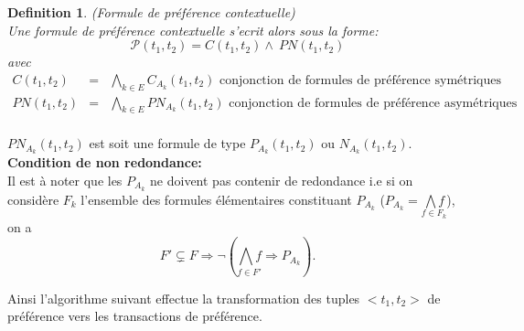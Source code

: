\documentclass[a4paper,12pt,openany,oneside]{article}
\newtheorem{defn}{Definition} %
\begin{document}
	
 	\begin{defn}(Formule de préférence contextuelle)\\
 	Une formule de préférence contextuelle s'ecrit alors sous la forme:
 	\[
 		\mathcal{P}(t_{1},t_{2})=C(t_{1},t_{2})\wedge\ PN(t_{1},t_{2})
 	\]
 	avec
 	\[
 	\begin{array}{rcl}
 			C(t_{1},t_{2})&=&\underset{k\in E}{\bigwedge} C_{A_{k}}(t_{1},t_{2}) \text{ conjonction de formules de préférence symétriques}\\
 			PN(t_{1},t_{2})&=&\underset{k\in E}{\bigwedge} PN_{A_{k}}(t_{1},t_{2})\text{ conjonction de formules de préférence asymétriques}\\  	\end{array}
 	\]
 
 	\end{defn}
	 $PN_{A_k}(t_1,t_2)$ est soit une formule de type $P_{A_k}(t_1,t_2)$ ou $N_{A_k}(t_1,t_2)$.\\

 
 
       	\textbf{Condition de non redondance:}\\
       	Il est à noter que les $P_{A_{k}}$ ne doivent pas contenir de redondance i.e si on considère $F_{k}$ l'ensemble des formules élémentaires constituant $P_{A_{k}}$ ($P_{A_{k}}=\underset{f\in F_{k}}{\bigwedge f}$), on a 
       	\[
       	 F'\subsetneq F\Rightarrow \neg (\underset{f\in F'}{\bigwedge f}\Rightarrow P_{A_{k}}).
       	\]
       	

 	 	   
 	   Ainsi l'algorithme suivant effectue la transformation des tuples $<t_1,t_2>$ de préférence vers les transactions de préférence.
 	   
\end{document}
